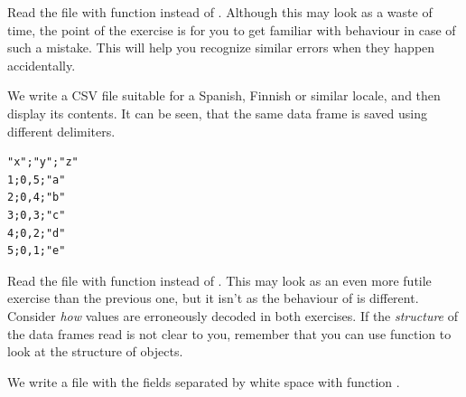 \documentclass[krantz2]{krantz}\usepackage{knitr}%
\begin{document}
\begin{playground}
Read the file with function  instead of . Although this may look as a waste of time, the point of the exercise is for you to get familiar with \Rlang behaviour in case of such a mistake. This will help you recognize similar errors when they happen accidentally.
\end{playground}

We write a CSV file suitable for a Spanish, Finnish or similar locale, and then display its contents. It can be seen, that the same data frame is saved using different delimiters.
\label{chunck:my:file1}
\begin{knitrout}\footnotesize
{}\color{fgcolor}\begin{kframe}
\begin{alltt}
  \hlstd{=} \hlstd{,}  \hlstd{=} \hlstd{)}
\hlstd{(}\hlstd{,}  \hlstd{=} \hlstd{)}
\end{alltt}
\end{kframe}
\end{knitrout}

\begin{knitrout}\footnotesize
{}\color{fgcolor}\begin{kframe}
\begin{verbatim}
"x";"y";"z"
1;0,5;"a"
2;0,4;"b"
3;0,3;"c"
4;0,2;"d"
5;0,1;"e"
\end{verbatim}
\end{kframe}
\end{knitrout}

\begin{playground}
Read the file with function  instead of . This may look as an even more futile exercise than the previous one, but it isn't as the behaviour of \Rlang is different. Consider \emph{how} values are erroneously decoded in both exercises. If the \emph{structure} of the data frames read is not clear to you, remember that you can use function  to look at the structure of \Rlang objects.
\end{playground}

We write a file with the fields separated by white space with function .
\begin{knitrout}\footnotesize
{}\color{fgcolor}\begin{kframe}
\begin{alltt}
  \hlstd{=} \hlstd{,}  \hlstd{=} \hlstd{)}
\hlstd{(}\hlstd{,}  \hlstd{=} \hlstd{)}
\end{alltt}
\end{kframe}
\end{knitrout}
\end{document}

